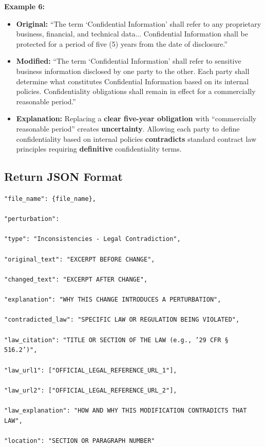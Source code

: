 \documentclass[11pt]{article}
\begin{document}
\begin{tcolorbox}[breakable,colback=lightestgray,colframe=black,title=\textbf{Inconsistency Legal Data Generation Prompt}]
\textbf{Example 6:}
\begin{itemize}
    \item \textbf{Original:} ``The term `Confidential Information' shall refer to any proprietary business, financial, and technical data... Confidential Information shall be protected for a period of five (5) years from the date of disclosure.''
    \item \textbf{Modified:} ``The term `Confidential Information' shall refer to sensitive business information disclosed by one party to the other. Each party shall determine what constitutes Confidential Information based on its internal policies. Confidentiality obligations shall remain in effect for a commercially reasonable period.''
    \item \textbf{Explanation:} Replacing a \textbf{clear five-year obligation} with ``commercially reasonable period'' creates \textbf{uncertainty}. Allowing each party to define confidentiality based on internal policies \textbf{contradicts} standard contract law principles requiring \textbf{definitive} confidentiality terms.
\end{itemize}

\subsection*{\textbf{Return JSON Format}}

{\small
\texttt{"file\_name": \{file\_name\},\\\\
"perturbation": \\\\
"type": "Inconsistencies - Legal Contradiction",\\\\
"original\_text": "EXCERPT BEFORE CHANGE",\\\\
"changed\_text": "EXCERPT AFTER CHANGE",\\\\
"explanation": "WHY THIS CHANGE INTRODUCES A PERTURBATION",\\\\
"contradicted\_law": "SPECIFIC LAW OR REGULATION BEING VIOLATED",\\\\
"law\_citation": "TITLE OR SECTION OF THE LAW (e.g., '29 CFR § 516.2')",\\\\
"law\_url1": ["OFFICIAL\_LEGAL\_REFERENCE\_URL\_1"],\\\\
"law\_url2": ["OFFICIAL\_LEGAL\_REFERENCE\_URL\_2"],\\\\
"law\_explanation": "HOW AND WHY THIS MODIFICATION CONTRADICTS THAT LAW",\\\\
"location": "SECTION OR PARAGRAPH NUMBER"\\\\}
}


\end{tcolorbox}
\end{document}

